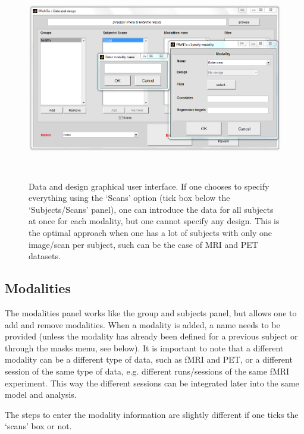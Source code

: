 \begin{figure}[!h]
  \begin{center}
      \includegraphics[height=3.5in]{images/Figure3.png}
   \caption{Data and design graphical user interface. If one chooses to specify everything using the `Scans' option (tick box below the `Subjects/Scans' panel), one can introduce the data for all subjects at once for each modality, but one cannot specify any design. This is the optimal approach when one has a lot of subjects with only one image/scan per subject, such can be the case of MRI and PET datasets.}
    \label{Fig2.3}
  \end{center}
\end{figure}

\subsection{Modalities} 

The modalities panel works like the group and subjects panel, but allows one to add and remove modalities. When a modality is added, a name needs to be provided (unless the modality has already been defined for a previous subject or through the masks menu, see below). It is important to note that a different modality can be a different type of data, such as fMRI and PET, or a different session of the same type of data, e.g. different runs/sessions of the same fMRI experiment. This way the different sessions can be integrated later into the same model and analysis.

The steps to enter the modality information are slightly different if one ticks the `scans' box or not.

